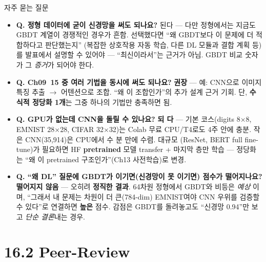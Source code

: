 \documentclass[aspectratio=169,11pt]{beamer}
\begin{document}
\begin{frame}{자주 묻는 질문}
  \small
  \begin{itemize}
    \item \textbf{Q. 정형 데이터에 굳이 신경망을 써도 되나요?} \;
      된다 — 다만 정형에서는 지금도 GBDT 계열이 경쟁적인 경우가 흔함.
      선택했다면 ``왜 GBDT보다 이 문제에 더 적합하다고 판단했는지''
      (복잡한 상호작용 자동 학습, 다른 DL 모듈과 결합 계획 등)를
      발표에서 설명할 수 있어야 — ``최신이라서''는 근거가 아님.
      GBDT 비교 숫자가 그 \textit{증거}가 되어야 한다.
    \item \textbf{Q. Ch09~15 중 여러 기법을 동시에 써도 되나요?} \;
      \textbf{권장} — 예: CNN으로 이미지 특징 추출 $\to$ 어텐션으로
      조합. ``왜 이 조합인가''의 추가 설계 근거 기회. 단,
      \textbf{수식적 정당화 1개}는 그중 하나의 기법만 충족하면 됨.
    \item \textbf{Q. GPU가 없는데 CNN을 돌릴 수 있나요?} \; \textbf{되
      다} — 기본 코스(digits 8$\times$8, EMNIST 28$\times$28,
      CIFAR 32$\times$32)는 Colab 무료 CPU/T4로도 4주 안에 충분.
      작은 CNN(35,914)은 CPU에서 수 분 만에 수렴. 대규모
      (ResNet, BERT full fine-tune)가 필요하면 HF \textbf{pretrained}
      모델 transfer + 마지막 층만 학습 — 정당화는 ``왜 이 pretrained
      구조인가''(Ch13 사전학습)로 변경.
    \item \textbf{Q. ``왜 DL'' 질문에 GBDT가 이기면(신경망이 못
      이기면) 점수가 떨어지나요?} \; \textbf{떨어지지 않음} — 오히려
      \textbf{정직한 결과}. 64차원 정형에서 GBDT와 비등은 \textit{예상
      }이며, ``그래서 내 문제는 차원이 더 큰(784-dim) EMNIST여야 CNN
      우위를 검증할 수 있다''로 연결하면 \textbf{높은} 점수.
      감점은 GBDT를 돌려놓고도 ``신경망 0.94''만 보고 \textit{단순
      결론}내는 경우.
  \end{itemize}
\end{frame}

\section{16.2 Peer-Review}
\end{document}
